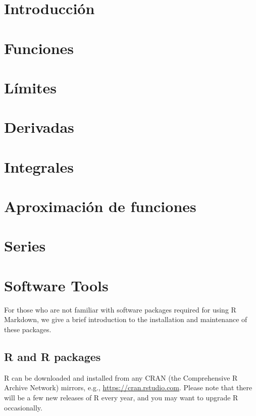 \documentclass[12pt,]{krantz}
\theoremstyle{definition}
\theoremstyle{definition}
\theoremstyle{definition}
\theoremstyle{remark}
\begin{document}
\chapter{Introducción}\label{introduccion}

\chapter{Funciones}\label{funciones}

\chapter{Límites}\label{limites}

\chapter{Derivadas}\label{derivadas}

\chapter{Integrales}\label{integrales}

\chapter{Aproximación de funciones}\label{aproximacion-de-funciones}

\chapter{Series}\label{series}

\cleardoublepage 

\appendix {}


\chapter{Software Tools}\label{software-tools}

For those who are not familiar with software packages required for using
R Markdown, we give a brief introduction to the installation and
maintenance of these packages.

\section{R and R packages}\label{r-and-r-packages}

R can be downloaded and installed from any CRAN (the Comprehensive R
Archive Network) mirrors, e.g., \url{https://cran.rstudio.com}. Please
note that there will be a few new releases of R every year, and you may
want to upgrade R occasionally.
\end{document}
